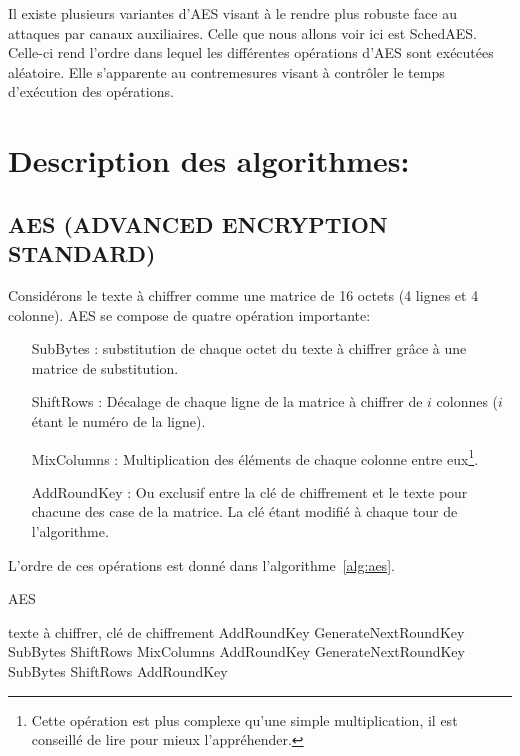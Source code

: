 \documentclass[letterpaper]{article}
\begin{document}
Il existe plusieurs variantes d'AES visant à le rendre plus robuste face au attaques par canaux auxiliaires.
Celle que nous allons voir ici est SchedAES.
Celle-ci rend l'ordre dans lequel les différentes opérations d'AES sont exécutées aléatoire.
Elle s'apparente au contremesures visant à contrôler le temps d'exécution des opérations.

\section{Description des algorithmes:}
\subsection{AES (ADVANCED ENCRYPTION STANDARD)}
Considérons le texte à chiffrer comme une matrice de 16 octets (4 lignes et 4 colonne).
AES se compose de quatre opération importante:
\begin{itemize}
    \item[SubBytes :] substitution de chaque octet du texte à chiffrer grâce à une matrice de substitution.
    \item[ShiftRows :] Décalage de chaque ligne de la matrice à chiffrer de $i$ colonnes ($i$ étant le numéro de la ligne).
    \item[MixColumns :] Multiplication des éléments de chaque colonne entre eux\footnote{Cette opération est plus complexe qu'une simple multiplication, il est conseillé de lire \cite{fips197} pour mieux l'appréhender.}.
    \item[AddRoundKey :] Ou exclusif entre la clé de chiffrement et le texte pour chacune des case de la matrice. La clé étant modifié à chaque tour de l'algorithme.
\end{itemize}

L'ordre de ces opérations est donné dans l'algorithme~\ref{alg:aes}.
\begin{algorithm}
    \caption{AES}
    \label{alg:aes}
    \begin{algorithmic}[1]
        \REQUIRE texte à chiffrer, clé de chiffrement
        \STATE AddRoundKey
        \STATE GenerateNextRoundKey
            \STATE SubBytes
            \STATE ShiftRows
            \STATE MixColumns
            \STATE AddRoundKey
            \STATE GenerateNextRoundKey
        \ENDFOR
        \STATE SubBytes
        \STATE ShiftRows
        \STATE AddRoundKey
    \end{algorithmic}
\end{algorithm}
\end{document}
